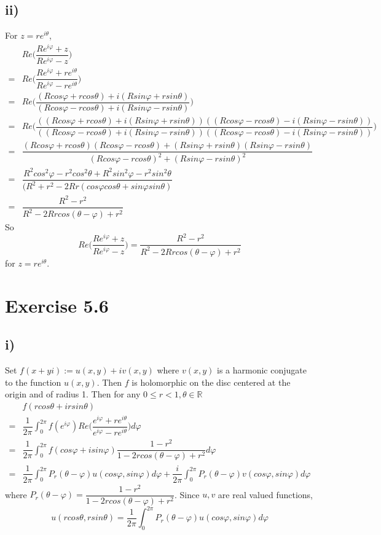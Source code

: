 \documentclass[a4paper,12pt,titlepage]{article}
\begin{document}
\subsection*{ii)}
For $z=re^{i\theta}$,
\begin{align*}
&Re\Big(\dfrac{Re^{i\varphi}+z}{Re^{i\varphi}-z}\Big)\\
=&Re\Big(\dfrac{Re^{i\varphi}+re^{i\theta}}{Re^{i\varphi}-re^{i\theta}}\Big)\\
=&Re\Big(\dfrac{(Rcos\varphi+rcos\theta)+i(Rsin\varphi+rsin\theta)}{(Rcos\varphi-rcos\theta)+i(Rsin\varphi-rsin\theta)}\Big)\\
=&Re\Big(\dfrac{((Rcos\varphi+rcos\theta)+i(Rsin\varphi+rsin\theta))((Rcos\varphi-rcos\theta)-i(Rsin\varphi-rsin\theta))}{((Rcos\varphi-rcos\theta)+i(Rsin\varphi-rsin\theta))((Rcos\varphi-rcos\theta)-i(Rsin\varphi-rsin\theta))}\Big)\\
=&\dfrac{(Rcos\varphi+rcos\theta)(Rcos\varphi-rcos\theta)+(Rsin\varphi+rsin\theta)(Rsin\varphi-rsin\theta)}{(Rcos\varphi-rcos\theta)^2+(Rsin\varphi-rsin\theta)^2}\\
=&\dfrac{R^2cos^2\varphi-r^2cos^2\theta+R^2sin^2\varphi-r^2sin^2\theta}{(R^2+r^2-2Rr(cos\varphi cos\theta+sin\varphi sin\theta)}\\
=&\dfrac{R^2-r^2}{R^2-2Rrcos(\theta-\varphi)+r^2}
\end{align*}
So $$Re\Big(\dfrac{Re^{i\varphi}+z}{Re^{i\varphi}-z}\Big)=\dfrac{R^2-r^2}{R^2-2Rrcos(\theta-\varphi)+r^2}$$
for $z=re^{i\theta}$.

\section*{Exercise 5.6}
\subsection*{i)}
Set $f(x+yi):=u(x,y)+iv(x,y)$ where $v(x,y)$ is a harmonic conjugate to the function $u(x,y)$. Then $f$ is holomorphic on the disc centered at the origin and of radius 1. Then for any $0\leqslant r<1,\theta\in\mathbb{R}$
\begin{align*}
&f(rcos\theta+irsin\theta)\\
=&\dfrac{1}{2\pi}\int_{0}^{2\pi}f(e^{i\varphi})Re\Big(\dfrac{e^{i\varphi}+re^{i\theta}}{e^{i\varphi}-re^{i\theta}}\Big) d\varphi\\
=&\dfrac{1}{2\pi}\int_{0}^{2\pi}f(cos\varphi+isin\varphi)\dfrac{1-r^2}{1-2rcos(\theta-\varphi)+r^2} d\varphi\\
=&\dfrac{1}{2\pi}\int_{0}^{2\pi}P_r(\theta-\varphi)u(cos\varphi,sin\varphi) d\varphi+\dfrac{i}{2\pi}\int_{0}^{2\pi}P_r(\theta-\varphi)v(cos\varphi,sin\varphi) d\varphi
\end{align*}
where $P_r(\theta-\varphi)=\dfrac{1-r^2}{1-2rcos(\theta-\varphi)+r^2}$. Since $u,v$ are real valued functions, 
$$u(rcos\theta,rsin\theta)=\dfrac{1}{2\pi}\int_{0}^{2\pi}P_r(\theta-\varphi)u(cos\varphi,sin\varphi) d\varphi$$
\end{document}
